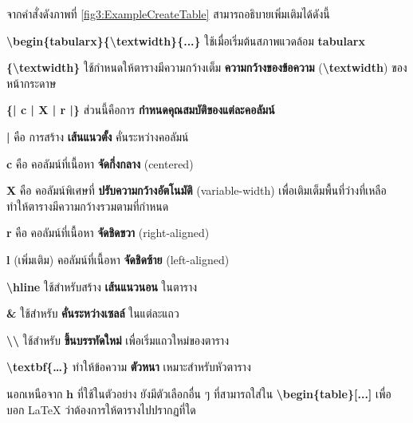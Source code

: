 \hspace*{1.5em} %
จากคำสั่งดังภาพที่ \ref{fig3:ExampleCreateTable} สามารถอธิบายเพิ่มเติมได้ดังนี้

\begin{mycustomitem}
    \item \textbf{\textbackslash begin\{tabularx\}\{\textbackslash textwidth\}\{...\}} ใช้เมื่อเริ่มต้นสภาพแวดล้อม \textbf{tabularx}
    \begin{mycustomitem}
        \item \textbf{\{\textbackslash textwidth\}} ใช้กำหนดให้ตารางมีความกว้างเต็ม \textbf{ความกว้างของข้อความ} (\textbf{\textbackslash textwidth}) ของหน้ากระดาษ
        \item \textbf{\{| c | X | r |\}} ส่วนนี้คือการ \textbf{กำหนดคุณสมบัติของแต่ละคอลัมน์}
        \begin{mycustomitem}
            \item \textbf{|} คือ การสร้าง \textbf{เส้นแนวตั้ง} คั่นระหว่างคอลัมน์
            \item \textbf{c} คือ คอลัมน์ที่เนื้อหา \textbf{จัดกึ่งกลาง} (centered)
            \item \textbf{X} คือ คอลัมน์พิเศษที่ \textbf{ปรับความกว้างอัตโนมัติ} (variable-width) เพื่อเติมเต็มพื้นที่ว่างที่เหลือ ทำให้ตารางมีความกว้างรวมตามที่กำหนด
            \item \textbf{r} คือ คอลัมน์ที่เนื้อหา \textbf{จัดชิดขวา} (right-aligned)
            \item \textbf{l} (เพิ่มเติม) คอลัมน์ที่เนื้อหา \textbf{จัดชิดซ้าย} (left-aligned)
        \end{mycustomitem}
    \end{mycustomitem}
    \item \textbf{\textbackslash hline} ใช้สำหรับสร้าง \textbf{เส้นแนวนอน} ในตาราง
    \item \textbf{\&} ใช้สำหรับ \textbf{คั่นระหว่างเซลล์} ในแต่ละแถว
    \item \textbf{\textbackslash\textbackslash} ใช้สำหรับ \textbf{ขึ้นบรรทัดใหม่} เพื่อเริ่มแถวใหม่ของตาราง
    \item \textbf{\textbackslash textbf\{\dots\}} ทำให้ข้อความ \textbf{ตัวหนา} เหมาะสำหรับหัวตาราง
\end{mycustomitem}

\newpage
\hspace*{1.5em} %
นอกเหนือจาก \textbf{h} ที่ใช้ในตัวอย่าง ยังมีตัวเลือกอื่น ๆ ที่สามารถใส่ใน \textbf{\textbackslash begin\{table\}[...]} เพื่อบอก LaTeX ว่าต้องการให้ตารางไปปรากฏที่ใด

